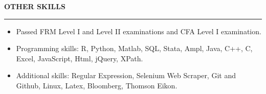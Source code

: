 \documentclass[a4paper,12pt]{report}
\begin{document}
 \par
\vspace{9pt}





\noindent 
\textbf{OTHER SKILLS} \par
\vspace{2pt}
\hrule
\vspace{6pt}
\noindent 
\begin{itemize}[noitemsep,topsep=0pt]
\item {\fontsize{10pt}{10pt}\selectfont Passed FRM Level I and Level II examinations and CFA Level I examination.} \par
\noindent 
\item {\fontsize{10pt}{10pt}\selectfont Programming skills: R, Python, Matlab, SQL, Stata, Ampl, Java, C++, C, Excel, JavaScript, Html, jQuery, XPath. } \par
\noindent 
\item {\fontsize{10pt}{10pt}\selectfont Additional skills: Regular Expression, Selenium Web Scraper, Git and Github, Linux, Latex, Bloomberg, Thomson Eikon.}\end{itemize}
 \par
\end{document}
